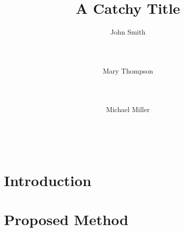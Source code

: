 \documentclass{vldb}
\begin{document}
\newcommand{\beq}{\begin{equation}}
	\newcommand{\eeq}{\end{equation}}
\newcommand{\bit}{\begin{itemize*}}
	\newcommand{\eit}{\end{itemize*}}
\newcommand{\goal}[1]{ {\noindent {$\Rightarrow$} \em {#1} } }
\newcommand{\hide}[1]{}
\newcommand{\comment}[1]{ {\footnotesize {#1} } }


\title{A Catchy Title}


\author{
       \alignauthor John Smith\\
       \\
       \\
       \\
       \alignauthor Mary Thompson\\
       \\
       \\
       \\
       \alignauthor Michael Miller\\
       \\
       \\
       \\
}

\maketitle
\begin{abstract}
	
\end{abstract}

\section{Introduction}
\label{sec:intro}


\section{Proposed Method}
\label{sec:proposed}

\end{document}
